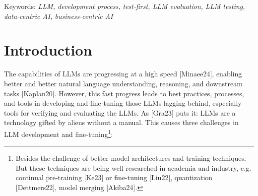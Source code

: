 \documentclass[twocolumn]{article}
\begin{document}
Keywords: {\em LLM, development process, test-first, LLM evaluation, LLM testing, data-centric AI, business-centric AI}

\section{Introduction}

The capabilities of LLMs are progressing at a high speed [Minaee24],
enabling better and better natural language understanding, reasoning, and downstream tasks [Kaplan20].
However, this fast progress leads to best practices, processes, and tools in developing and fine-tuning those LLMs lagging behind,
especially tools for verifying and evaluating the LLMs.
As [Gra23] puts it: LLMs are a technology gifted by aliens without a manual.
This causes three challenges in LLM development and fine-tuning\footnote{Besides the challenge of better model architectures and training techniques. But these techniques are being well researched in academia and industry, e.g. continual pre-training [Ke23] or fine-tuning [Liu22], quantization [Dettmers22], model merging [Akiba24].}:
\end{document}
